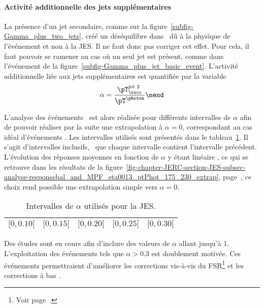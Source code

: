 \paragraph{Activité additionnelle des jets supplémentaires}
La présence d'un jet secondaire, comme sur la figure~\ref{subfig-Gamma_plus_two_jets}, créé un déséquilibre dans \Rbal\ dû à la physique de l'événement et non à la JES. Il ne faut donc pas corriger cet effet.
Pour cela, il faut pouvoir se ramener au cas où un seul jet est présent, comme dans l'événement de la figure~\ref{subfig-Gamma_plus_jet_basic_event}.
L'activité additionnelle liée aux jets supplémentaires est quantifiée par la variable
\begin{equation}
\alpha = \frac{\pT_\reco^\text{jet 2}}{\pT^{\photon}}
\mend
\label{eq-chapter-JERC-definition_alpha}
\end{equation}
\par L'analyse des événements \Gjets\ est alors réalisée pour différents intervalles de $\alpha$ afin de pouvoir réaliser par la suite une extrapolation à $\alpha=0$, correspondant au cas idéal d'événements \Gjet.
Les intervalles utilisés sont présentés dans le tableau~\ref{tab-alpha_intervalles}.
Il s'agit d'intervalles inclusifs, \ie\ que chaque intervalle contient l'intervalle précédent.
L'évolution des réponses moyennes en fonction de $\alpha$ y étant linéaire \aposteriori, ce qui se retrouve dans les résultats de la figure~\ref{fig-chapter-JERC-section-JES-subsec-analyse-responsebal_and_MPF_eta0013_ptPhot_175_230_extrap}, page~\pageref{fig-chapter-JERC-section-JES-subsec-analyse-responsebal_and_MPF_eta0013_ptPhot_175_230_extrap}, ce choix rend possible une extrapolation simple vers $\alpha=0$.
\begin{table}[h]
\centering
\begin{tabular}{ccccc}
\toprule
$[\num{0}, \num{0.10}[$ & $[\num{0}, \num{0.15}[$ & $[\num{0}, \num{0.20}[$ & $[\num{0}, \num{0.25}[$ & $[\num{0}, \num{0.30}[$ \\
\bottomrule
\end{tabular}
\caption{Intervalles de $\alpha$ utilisés pour la JES.}
\label{tab-alpha_intervalles}
\end{table}
\par Des études sont en cours afin d'inclure des valeurs de $\alpha$ allant jusqu'à \num{1}.
L'exploitation des événements tels que $\alpha>\num{0.3}$ est doublement motivée.
Ces événements permettraient d'améliorer les corrections vis-à-vis du FSR\footnote{Voir page~\pageref{subfig-fgraph-gq_qGamma_S-FSR_2jets}.} et les corrections à bas \pT.
